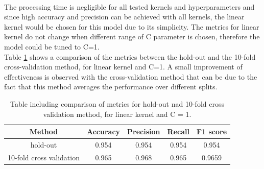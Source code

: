 \documentclass{article}
\begin{document}
\\The processing time is negligible for all tested kernels and hyperparameters and since high accuracy and precision can be achieved with all kernels, the linear kernel would be chosen for this model due to its simplicity. The metrics for linear kernel do not change when different range of C parameter is chosen, therefore the model could be tuned to C=1.
\\Table \ref{table:votings_SVM_cross} shows a comparison of the metrics between the hold-out and the 10-fold cross-validation method, for linear kernel and C=1. A small improvement of effectiveness is observed with the cross-validation method that can be due to the fact that this method averages the performance over different splits.
\begin{table}[h!]
\centering
\begin{tabular}{||c c c c c||} 
 \hline
Method &  Accuracy & Precision & Recall & F1 score \\ [0.5ex] 
 \hline\hline
hold-out & 0.954 & 0.954 & 0.954 & 0.954  \\  
 10-fold cross validation &  0.965&  0.968 & 0.965& 0.9659 \\ [1ex] 
 \hline
\end{tabular}
\caption{Table including comparison of metrics for hold-out nad 10-fold cross validation method, for linear kernel and C = 1.}
\label{table:votings_SVM_cross}
\end{table}
\end{document}
